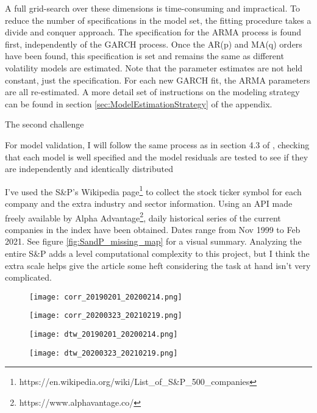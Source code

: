 \documentclass[12pt]{article}
\begin{document}
A full grid-search over these dimensions is time-consuming and impractical. To reduce the number of specifications in the model set, the fitting procedure takes a divide and conquer approach. The specification for the ARMA process is found first, independently of the GARCH process. Once the AR(p) and MA(q) orders have been found, this specification is set and remains the same as different volatility models are estimated. Note that the parameter estimates are not held constant, just the specification. For each new GARCH fit, the ARMA parameters are all re-estimated. A more detail set of instructions on the modeling strategy can be found in section \ref{sec:ModelEstimationStrategy} of the appendix.

The second challenge 




For model validation, I will follow the same process as in section 4.3 of \cite{DowiakTV-COP}, checking that each model is well specified and the model residuals are tested to see if they are independently and identically distributed



I've used the S\&P's Wikipedia page\footnote{https://en.wikipedia.org/wiki/List\_of\_S\&P\_500\_companies} to collect the stock ticker symbol for each company and the extra industry and sector information. Using an API made freely available by Alpha Advantage\footnote{https://www.alphavantage.co/}, daily historical series of the current companies in the index have been obtained. Dates range from Nov 1999 to Feb 2021. See figure \ref{fig:SandP_missing_map} for a visual summary. Analyzing the entire S\&P adds a level computational complexity to this project, but I think the extra scale helps give the article some heft considering the task at hand isn't very complicated.



\begin{figure}
    \centering
    \texttt{[image: corr\_20190201\_20200214.png]}
    \caption{}
    \label{fig:Ng1}

    \bigbreak

    \texttt{[image: corr\_20200323\_20210219.png]}
    \caption{}
    \label{fig:Ng2}
\end{figure}


\begin{figure}
    \centering
    \texttt{[image: dtw\_20190201\_20200214.png]}
    \caption{}
    \label{fig:Ng3}

    \bigbreak

    \texttt{[image: dtw\_20200323\_20210219.png]}
    \caption{}
    \label{fig:Ng4}
\end{figure}
\end{document}
